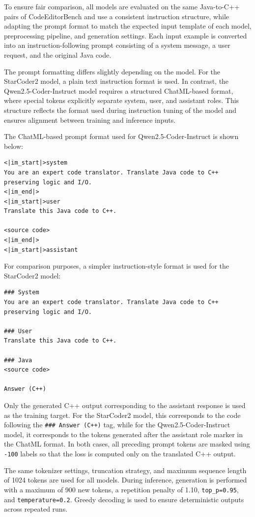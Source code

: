To ensure fair comparison, all models are evaluated on the same Java-to-C++
pairs of CodeEditorBench and use a consistent instruction structure, while adapting the prompt format to match the expected input template of each model,
preprocessing pipeline, and generation settings. Each input example is converted into an instruction-following prompt consisting of a system message, a user request, and the original Java code.

The prompt formatting differs slightly depending on the model. For
the StarCoder2 model, a plain text instruction format is used. In contrast, the
Qwen2.5-Coder-Instruct model requires a structured ChatML-based format, where
special tokens explicitly separate system, user, and assistant roles. This structure reflects the format used during instruction tuning of the model and ensures alignment between training and inference inputs.

The ChatML-based prompt format used for Qwen2.5-Coder-Instruct is shown below:

\begin{lstlisting}
<|im_start|>system
You are an expert code translator. Translate Java code to C++ preserving logic and I/O.
<|im_end|>
<|im_start|>user
Translate this Java code to C++.

<source code>
<|im_end|>
<|im_start|>assistant
\end{lstlisting}

For comparison purposes, a simpler instruction-style format is used for the
StarCoder2 model:

\begin{lstlisting}
### System
You are an expert code translator. Translate Java code to C++ preserving logic and I/O.

### User
Translate this Java code to C++.

### Java
<source code>

Answer (C++)
\end{lstlisting}

Only the generated C++ output corresponding to the assistant response is used
as the training target. For the StarCoder2 model, this corresponds to the code
following the \texttt{\#\#\# Answer (C++)} tag, while for the
Qwen2.5-Coder-Instruct model, it corresponds to the tokens generated after the
assistant role marker in the ChatML format. In both cases, all preceding prompt
tokens are masked using \texttt{-100} labels so that the loss is computed only
on the translated C++ output.

The same tokenizer settings, truncation strategy, and maximum sequence length
of 1024 tokens are used for all models. During inference, generation is
performed with a maximum of 900 new tokens, a repetition penalty of 1.10,
\texttt{top\_p=0.95}, and \texttt{temperature=0.2}. Greedy decoding is used
to ensure deterministic outputs across repeated runs.

